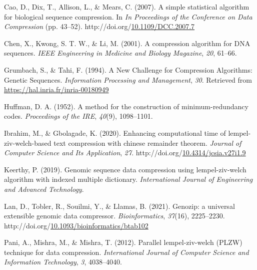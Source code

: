 \documentclass[12pt,twoside]{reedthesis}
\newlength{\cslhangindent}
\newenvironment{CSLReferences}[2] %
 {%
  \setlength{\parindent}{0pt}
  \ifodd #1 \everypar{\setlength{\hangindent}{\cslhangindent}}\ignorespaces\fi
  \ifnum #2 > 0
  \setlength{\parskip}{#2\baselineskip}
  \fi
 }%
 {}
\begin{document}
\hypertarget{refs}{}
\begin{CSLReferences}{1}{0}
\leavevmode{}%
Cao, D., Dix, T., Allison, L., \& Mears, C. (2007). A simple statistical algorithm for biological sequence compression. In \emph{In Proceedings of the Conference on Data Compression} (pp. 43--52). http://doi.org/\href{https://doi.org/10.1109/DCC.2007.7}{10.1109/DCC.2007.7}

\leavevmode{}%
Chen, X., Kwong, S. T. W., \& Li, M. (2001). A compression algorithm for DNA sequences. \emph{IEEE Engineering in Medicine and Biology Magazine}, \emph{20}, 61--66.

\leavevmode{}%
Grumbach, S., \& Tahi, F. (1994). {A New Challenge for Compression Algorithms: Genetic Sequences}. \emph{{Information Processing and Management}}, \emph{30}. Retrieved from \url{https://hal.inria.fr/inria-00180949}

\leavevmode{}%
Huffman, D. A. (1952). A method for the construction of minimum-redundancy codes. \emph{Proceedings of the IRE}, \emph{40}(9), 1098--1101.

\leavevmode{}%
Ibrahim, M., \& Gbolagade, K. (2020). Enhancing computational time of lempel-ziv-welch-based text compression with chinese remainder theorem. \emph{Journal of Computer Science and Its Application}, \emph{27}. http://doi.org/\href{https://doi.org/10.4314/jcsia.v27i1.9}{10.4314/jcsia.v27i1.9}

\leavevmode{}%
Keerthy, P. (2019). Genomic sequence data compression using lempel-ziv-welch algorithm with indexed multiple dictionary. \emph{International Journal of Engineering and Advanced Technology}.

\leavevmode{}%
Lan, D., Tobler, R., Souilmi, Y., \& Llamas, B. (2021). {Genozip: a universal extensible genomic data compressor}. \emph{Bioinformatics}, \emph{37}(16), 2225--2230. http://doi.org/\href{https://doi.org/10.1093/bioinformatics/btab102}{10.1093/bioinformatics/btab102}

\leavevmode{}%
Pani, A., Mishra, M., \& Mishra, T. (2012). Parallel lempel-ziv-welch (PLZW) technique for data compression. \emph{International Journal of Computer Science and Information Technology}, \emph{3}, 4038--4040.


\end{CSLReferences}
\end{document}

